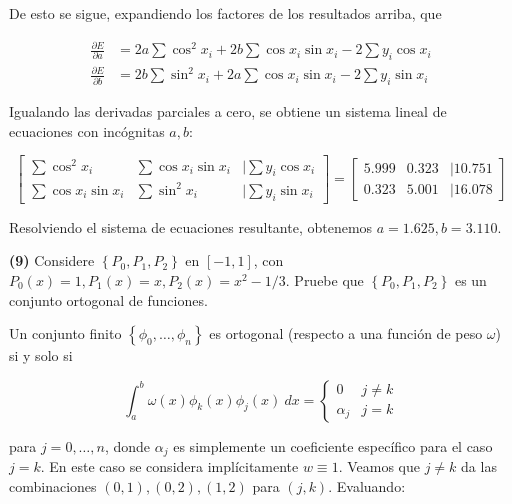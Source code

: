 \documentclass[12pt]{article}
\begin{document}
De esto se sigue, expandiendo los factores de los resultados arriba, que 

\begin{align*}
    \frac{\partial E}{\partial a} &= 2a \sum \cos^2 x_i + 2b \sum \cos x_i \sin x_i - 2\sum y_i \cos x_i \\ 
    \frac{\partial E}{\partial b} &= 2b\sum \sin^2 x_i + 2a \sum \cos x_i \sin x_i - 2\sum y_i \sin x_i
\end{align*}

Igualando las derivadas parciales a cero, se obtiene un sistema lineal de ecuaciones con incógnitas $a, b$:

\begin{equation*}
    \begin{bmatrix} 
        \sum \cos^2 x_i & \sum \cos x_i \sin x_i & \mid \sum y_i \cos x_i \\ 
        \sum \cos x_i \sin x_i & \sum \sin^2 x_i & \mid \sum y_i \sin x_i
    \end{bmatrix} = \begin{bmatrix} 
        5.999 & 0.323 & \mid 10.751 \\ 
        0.323 & 5.001 &\mid 16.078
    \end{bmatrix} 
\end{equation*}

Resolviendo el sistema de ecuaciones resultante, obtenemos $a = 1.625, b = 3.110$.

\pagebreak

\begin{myframe}
\textbf{(9)} Considere $\left\{ P_0, P_1, P_2 \right\} $ en $[-1, 1]$,
con $P_0(x) = 1, P_1(x)=x, P_2(x) = x^2 - 1 /3$. Pruebe que $\left\{ P_0, P_1,
P_2 \right\} $ es un conjunto ortogonal de funciones.
\end{myframe}

Un conjunto finito $\left\{ \phi_0, \ldots, \phi_n \right\} $ es ortogonal
(respecto a una función de peso $\omega$) si y solo si 

\begin{equation*}
    \int_a^b \omega(x) \phi_k(x) \phi_j(x) ~ dx = \begin{cases}
        0 & j \neq k \\ 
        \alpha_j & j = k
    \end{cases}
\end{equation*}

para $j = 0, \ldots, n$, donde $\alpha_j$ es simplemente un coeficiente
específico para el caso $j = k$. En este caso se considera implícitamente $w
\equiv 1$. Veamos que $j \neq k$ da las combinaciones $(0, 1), (0, 2), (1, 2)$
para $(j, k)$. Evaluando:
\end{document}
